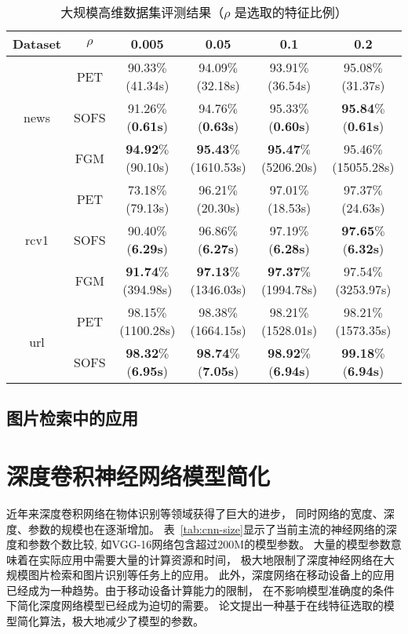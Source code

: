 \begin{table}[htpb]
    \centering
    \caption{大规模高维数据集评测结果（$\rho$ 是选取的特征比例）}
    \label{tbl:sofs-comp-big}
    \footnotesize
    \begin{tabular}{|c|c|c|c|c|c|}
        \hline
        Dataset & $\rho$ & 0.005 & 0.05 & 0.1 & 0.2\\\hline
        \multirow{3}{*}{news}& PET & 90.33$\%$(41.34s) & 94.09$\%$(32.18s) &
        93.91$\%$(36.54s) & 95.08$\%$(31.37s) \\
        &SOFS &  91.26$\%$(\textbf{0.61s}) & 94.76$\%$(\textbf{0.63s})  &
        95.33$\%$(\textbf{0.60s})  & \textbf{95.84}$\%$(\textbf{0.61s})\\
        &FGM  & \textbf{94.92}$\%$(90.10s)&
        \textbf{95.43}$\%$(1610.53s) & \textbf{95.47}$\%$(5206.20s) &
        95.46$\%$(15055.28s)\\\hline
        \multirow{3}{*}{rcv1} & PET & 73.18$\%$(79.13s)& 96.21$\%$(20.30s)&
        97.01$\%$(18.53s) & 97.37$\%$(24.63s)\\
        &SOFS & 90.40$\%$(\textbf{6.29s}) & 96.86$\%$(\textbf{6.27s}) &
        97.19$\%$(\textbf{6.28s}) & \textbf{97.65}$\%$(\textbf{6.32s})\\
        &FGM & \textbf{91.74}$\%$(394.98s)&
        \textbf{97.13}$\%$(1346.03s) & \textbf{97.37}$\%$(1994.78s)&
        97.54$\%$(3253.97s)\\\hline
        \multirow{2}{*}{url} & PET &  98.15$\%$(1100.28s)& 98.38$\%$(1664.15s) &
        98.21$\%$(1528.01s) &	98.21$\%$(1573.35s)\\
        &SOFS & \textbf{98.32}$\%$(\textbf{6.95s})  & \textbf{98.74}$\%$(\textbf{7.05s}) &
        \textbf{98.92}$\%$(\textbf{6.94s}) & \textbf{99.18}$\%$(\textbf{6.94s}) \\
        \hline
    \end{tabular}
\end{table}

\subsection{图片检索中的应用}
\section{深度卷积神经网络模型简化}
近年来深度卷积网络在物体识别等领域获得了巨大的进步，
同时网络的宽度、深度、参数的规模也在逐渐增加。
表~\ref{tab:cnn-size}显示了当前主流的神经网络的深度和参数个数比较,
如VGG-16网络包含超过200M的模型参数。
大量的模型参数意味着在实际应用中需要大量的计算资源和时间，
极大地限制了深度神经网络在大规模图片检索和图片识别等任务上的应用。
此外，深度网络在移动设备上的应用已经成为一种趋势。由于移动设备计算能力的限制，
在不影响模型准确度的条件下简化深度网络模型已经成为迫切的需要。
论文提出一种基于在线特征选取的模型简化算法，极大地减少了模型的参数。

